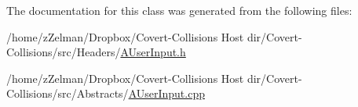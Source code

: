 The documentation for this class was generated from the following files\-:\begin{DoxyCompactItemize}
\item 
/home/z\-Zelman/\-Dropbox/\-Covert-\/\-Collisions Host dir/\-Covert-\/\-Collisions/src/\-Headers/\hyperlink{AUserInput_8h}{A\-User\-Input.\-h}\item 
/home/z\-Zelman/\-Dropbox/\-Covert-\/\-Collisions Host dir/\-Covert-\/\-Collisions/src/\-Abstracts/\hyperlink{AUserInput_8cpp}{A\-User\-Input.\-cpp}\end{DoxyCompactItemize}
